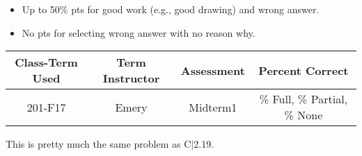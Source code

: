 \begin{rubric}

\begin{itemize}
	\item Up to 50\% pts for good work (e.g., good drawing) and wrong answer.
	\item No pts for selecting wrong answer with no reason why.
\end{itemize}

\end{rubric}

\begin{outcomes}
	\begin{center}
		\begin{tabular}{cccc}
			\hline\hline
			Class-Term Used & Term Instructor & Assessment & Percent Correct\\
			\hline
			201-F17 & Emery & Midterm1 & \% Full, \% Partial, \% None\\    %
			\hline
		\end{tabular}
	\end{center}
\end{outcomes}

\begin{comments}

This is pretty much the same problem as C$|$2.19.
	
\end{comments}
